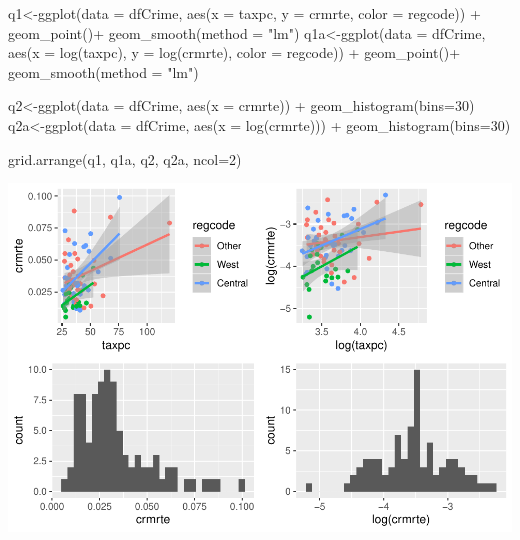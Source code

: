 \documentclass[]{article}
\newenvironment{Shaded}{}{}
\newcommand{\DataTypeTok}[1]{#1}
\newcommand{\DecValTok}[1]{#1}
\newcommand{\KeywordTok}[1]{\textcolor[rgb]{0.00,0.00,1.00}{#1}}
\newcommand{\NormalTok}[1]{#1}
\newcommand{\OperatorTok}[1]{#1}
\newcommand{\StringTok}[1]{\textcolor[rgb]{0.00,0.50,0.50}{#1}}
\begin{document}
\begin{Shaded}
\begin{Highlighting}[]
\NormalTok{q1<-}\KeywordTok{ggplot}\NormalTok{(}\DataTypeTok{data =}\NormalTok{ dfCrime, }\KeywordTok{aes}\NormalTok{(}\DataTypeTok{x =}\NormalTok{ taxpc, }\DataTypeTok{y =}\NormalTok{ crmrte, }\DataTypeTok{color =}\NormalTok{ regcode)) }\OperatorTok{+}\StringTok{ }
\StringTok{      }\KeywordTok{geom_point}\NormalTok{()}\OperatorTok{+}
\StringTok{  }\KeywordTok{geom_smooth}\NormalTok{(}\DataTypeTok{method =} \StringTok{"lm"}\NormalTok{)}
\NormalTok{q1a<-}\KeywordTok{ggplot}\NormalTok{(}\DataTypeTok{data =}\NormalTok{ dfCrime, }\KeywordTok{aes}\NormalTok{(}\DataTypeTok{x =} \KeywordTok{log}\NormalTok{(taxpc), }\DataTypeTok{y =} \KeywordTok{log}\NormalTok{(crmrte), }\DataTypeTok{color =}\NormalTok{ regcode)) }\OperatorTok{+}\StringTok{ }
\StringTok{      }\KeywordTok{geom_point}\NormalTok{()}\OperatorTok{+}
\StringTok{  }\KeywordTok{geom_smooth}\NormalTok{(}\DataTypeTok{method =} \StringTok{"lm"}\NormalTok{)}

\NormalTok{q2<-}\KeywordTok{ggplot}\NormalTok{(}\DataTypeTok{data =}\NormalTok{ dfCrime, }\KeywordTok{aes}\NormalTok{(}\DataTypeTok{x =}\NormalTok{ crmrte)) }\OperatorTok{+}\StringTok{ }
\StringTok{      }\KeywordTok{geom_histogram}\NormalTok{(}\DataTypeTok{bins=}\DecValTok{30}\NormalTok{)}
\NormalTok{q2a<-}\KeywordTok{ggplot}\NormalTok{(}\DataTypeTok{data =}\NormalTok{ dfCrime, }\KeywordTok{aes}\NormalTok{(}\DataTypeTok{x =} \KeywordTok{log}\NormalTok{(crmrte))) }\OperatorTok{+}\StringTok{ }
\StringTok{      }\KeywordTok{geom_histogram}\NormalTok{(}\DataTypeTok{bins=}\DecValTok{30}\NormalTok{)}

\KeywordTok{grid.arrange}\NormalTok{(q1, q1a, q2, q2a, }\DataTypeTok{ncol=}\DecValTok{2}\NormalTok{)}
\end{Highlighting}
\end{Shaded}

\includegraphics{Bagnard_Gaustad_Hartman_Leung_Lab_3_files/figure-latex/unnamed-chunk-98-1.pdf}
\end{document}

